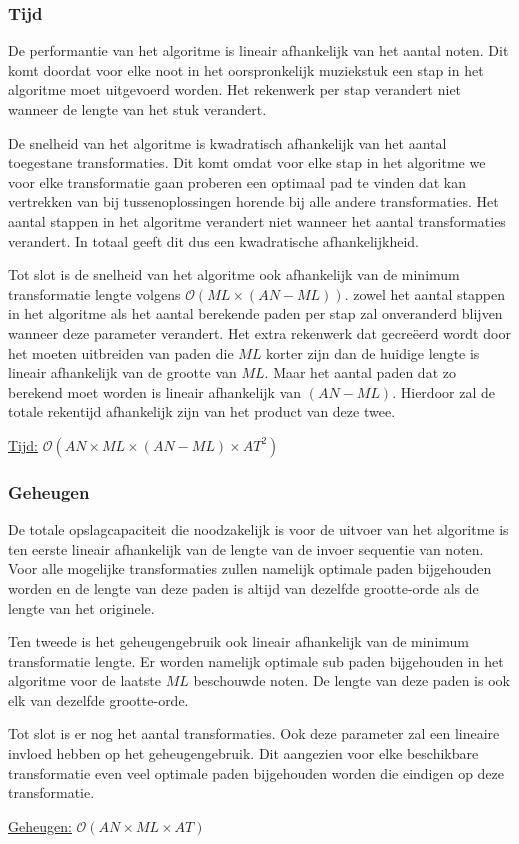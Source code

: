\subsubsection{Tijd}
De performantie van het algoritme is lineair afhankelijk van het aantal noten. Dit komt doordat voor elke noot in het oorspronkelijk muziekstuk een stap in het algoritme moet uitgevoerd worden. Het rekenwerk per stap verandert niet wanneer de lengte van het stuk verandert.
 
De snelheid van het algoritme is kwadratisch afhankelijk van het aantal toegestane transformaties. Dit komt omdat voor elke stap in het algoritme we voor elke transformatie gaan proberen een optimaal pad te vinden dat kan vertrekken van bij tussenoplossingen horende bij alle andere transformaties. Het aantal stappen in het algoritme verandert niet wanneer het aantal transformaties verandert. In totaal geeft dit dus een kwadratische afhankelijkheid.

Tot slot is de snelheid van het algoritme ook afhankelijk van de minimum transformatie lengte volgens $\mathcal{O}(ML \times (AN-ML))$. zowel het aantal stappen in het algoritme als het aantal berekende paden per stap zal onveranderd blijven wanneer deze parameter verandert. Het extra rekenwerk dat gecre\"eerd wordt door het moeten uitbreiden van paden die $ML$ korter zijn dan de huidige lengte is lineair afhankelijk van de grootte van $ML$. Maar het aantal paden dat zo berekend moet worden is lineair afhankelijk van $(AN-ML)$. Hierdoor zal de totale rekentijd afhankelijk zijn van het product van deze twee.

\begin{center}
\underline{Tijd:} $\mathcal{O}(AN \times ML \times (AN-ML) \times AT^2)$
\end{center}

\subsubsection{Geheugen}
De totale opslagcapaciteit die noodzakelijk is voor de uitvoer van het algoritme is ten eerste lineair afhankelijk van de lengte van de invoer sequentie van noten. Voor alle mogelijke transformaties zullen namelijk optimale paden bijgehouden worden en de lengte van deze paden is altijd van dezelfde grootte-orde als de lengte van het originele.

Ten tweede is het geheugengebruik ook lineair afhankelijk van de minimum transformatie lengte. Er worden namelijk optimale sub paden bijgehouden in het algoritme voor de laatste $ML$ beschouwde noten. De lengte van deze paden is ook elk van dezelfde grootte-orde.
 
Tot slot is er nog het aantal transformaties. Ook deze parameter zal een lineaire invloed hebben op het geheugengebruik. Dit aangezien voor elke beschikbare transformatie even veel optimale paden bijgehouden worden die eindigen op deze transformatie.  

\begin{center}
\underline{Geheugen:} $\mathcal{O}(AN \times ML \times AT)$
\end{center}

